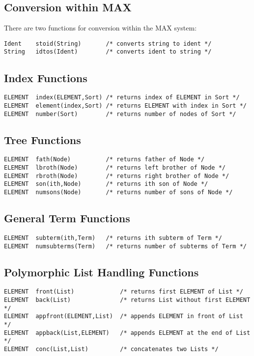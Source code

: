 \subsection{Conversion within MAX}
There are two functions for conversion within the MAX system:
\begin{verbatim}
Ident    stoid(String)       /* converts string to ident */       
String   idtos(Ident)        /* converts ident to string */
\end{verbatim}

\subsection{Index Functions}
\begin{verbatim}
ELEMENT  index(ELEMENT,Sort) /* returns index of ELEMENT in Sort */
ELEMENT  element(index,Sort) /* returns ELEMENT with index in Sort */
ELEMENT  number(Sort)        /* returns number of nodes of Sort */
\end{verbatim}

\subsection{Tree Functions}
\begin{verbatim}
ELEMENT  fath(Node)          /* returns father of Node */
ELEMENT  lbroth(Node)        /* returns left brother of Node */
ELEMENT  rbroth(Node)        /* returns right brother of Node */
ELEMENT  son(ith,Node)       /* returns ith son of Node */
ELEMENT  numsons(Node)       /* returns number of sons of Node */
\end{verbatim}

\subsection{General Term Functions}
\begin{verbatim}
ELEMENT  subterm(ith,Term)   /* returns ith subterm of Term */
ELEMENT  numsubterms(Term)   /* returns number of subterms of Term */
\end{verbatim}
\subsection{Polymorphic List Handling Functions}
\begin{verbatim}
ELEMENT  front(List)             /* returns first ELEMENT of List */
ELEMENT  back(List)              /* returns List without first ELEMENT */
ELEMENT  appfront(ELEMENT,List)  /* appends ELEMENT in front of List */
ELEMENT  appback(List,ELEMENT)   /* appends ELEMENT at the end of List */
ELEMENT  conc(List,List)         /* concatenates two Lists */
\end{verbatim}
